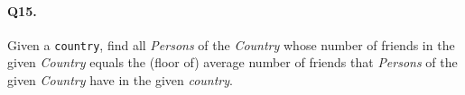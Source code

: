 \paragraph{Q15.}
Given a \texttt{country}, find all \emph{Persons} of the \emph{Country}
whose number of friends in the given \emph{Country} equals the (floor
of) average number of friends that \emph{Persons} of the given
\emph{Country} have in the given \emph{country}.
